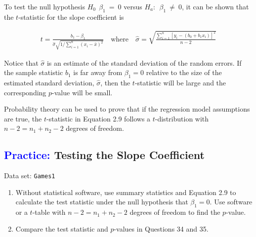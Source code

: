 \documentclass[
]{report}
\begin{document}
To test the null hypothesis \(\scriptstyle H_0\:\  \beta_1 \ = \ 0\) versus \(\scriptstyle H_a:\ \ \beta_1 \ \ne \ 0\), it can be shown that the \(\scriptstyle t\)-statistic for the slope coefficient is

\begin{align} 
\label{2.9}
t = \frac{b_1 - \beta_1}{\hat{\sigma} \sqrt{1 / \sum_{i=1}^{n}(x_i - \bar{x})^2}} \quad \text{where} \quad \hat{\sigma} = \sqrt{\frac{\sum_{i=1}^{n}[y_i - (b_0 + b_1 x_i)]^2}{n-2}}
\tag{2.9}
\end{align}

Notice that \(\scriptstyle \hat{\sigma}\) is an estimate of the standard deviation of the random errors. If the sample statistic \(\scriptstyle b_1\) is far away from \(\scriptstyle \beta_1 = 0\) relative to the size of the estimated standard deviation, \(\scriptstyle \hat{\sigma}\), then the \(\scriptstyle t\)-statistic will be large and the corresponding \(\scriptstyle p\)-value will be small.

Probability theory can be used to prove that if the regression model assumptions are true, the \(\scriptstyle t\)-statistic in Equation 2.9 follows a \(\scriptstyle t\)-distribution with \(\scriptstyle n - 2 = n_1 + n_2 - 2\) degrees of freedom.

\hypertarget{testing-the-slope-coefficient}{%
\subsection*{\texorpdfstring{\textcolor{blue}{Practice:} Testing the Slope Coefficient}{ Testing the Slope Coefficient}}\label{testing-the-slope-coefficient}}

\vspace{-1em}

Data set: \texttt{Games1}

\begin{enumerate}
\def\labelenumi{\arabic{enumi}.}
\setcounter{enumi}{34}
\item
  Without statistical software, use summary statistics and Equation 2.9 to calculate the test statistic under the null hypothesis that \(\scriptstyle \beta_1 = 0\). Use software or a \(\scriptstyle t\)-table with \(\scriptstyle n - 2 = n_1 + n_2 - 2\) degrees of freedom to find the \(\scriptstyle p\)-value.
\item
  Compare the test statistic and \(\scriptstyle p\)-values in Questions 34 and 35.
\end{enumerate}
\end{document}
